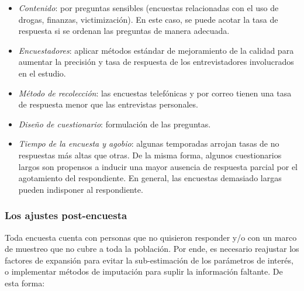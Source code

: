 \documentclass[
  10pt,
  spanish,
]{book}
\providecommand{\tightlist}{%
  \setlength{\itemsep}{0pt}\setlength{\parskip}{0pt}}
\begin{document}
\begin{itemize}
\tightlist
\item
  \emph{Contenido}: por preguntas sensibles (encuestas relacionadas con el uso de drogas, finanzas, victimización). En este caso, se puede acotar la tasa de respuesta si se ordenan las preguntas de manera adecuada.
\item
  \emph{Encuestadores}: aplicar métodos estándar de mejoramiento de la calidad para aumentar la precisión y tasa de respuesta de los entrevistadores involucrados en el estudio.
\item
  \emph{Método de recolección}: las encuestas telefónicas y por correo tienen una tasa de respuesta menor que las entrevistas personales.
\item
  \emph{Diseño de cuestionario}: formulación de las preguntas.
\item
  \emph{Tiempo de la encuesta y agobio}: algunas temporadas arrojan tasas de no respuestas más altas que otras. De la misma forma, algunos cuestionarios largos son propensos a inducir una mayor ausencia de respuesta parcial por el agotamiento del respondiente. En general, las encuestas demasiado largas pueden indisponer al respondiente.
\end{itemize}

\hypertarget{los-ajustes-post-encuesta}{%
\subsubsection*{Los ajustes post-encuesta}\label{los-ajustes-post-encuesta}}

Toda encuesta cuenta con personas que no quisieron responder y/o con un marco de muestreo que no cubre a toda la población. Por ende, es necesario reajustar los factores de expansión para evitar la sub-estimación de los parámetros de interés, o implementar métodos de imputación para suplir la información faltante. De esta forma:
\end{document}
